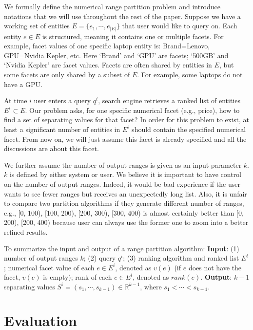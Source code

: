 We formally define the numerical range partition problem and introduce notations that we will use throughout the rest of the paper. Suppose we have a working set of entities $E=\{e_1, \cdots, e_{|E|}\}$ that user would like to query on. Each entity $e\in E$ is structured, meaning it contains one or multiple facets. For example, facet values of one specific laptop entity is: Brand=Lenovo, GPU=Nvidia Kepler, etc. Here `Brand' and `GPU' are facets; `500GB' and `Nvidia Kepler' are facet values. Facets are often shared by entities in $E$, but some facets are only shared by a subset of $E$. For example, some laptops do not have a GPU. 


At time $i$ user enters a query $q^i$, search engine retrieves a ranked list of entities $E^i\subset E$. Our problem asks, for one specific numerical facet (e.g., price), how to find a set of separating values for that facet? In order for this problem to exist, at least a significant number of entities in $E^i$ should contain the specified numerical facet. From now on, we will just assume this facet is already specified and all the discussions are about this facet. 

We further assume the number of output ranges is given as an input parameter $k$. $k$ is defined by either system or user. We believe it is important to have control on the number of output ranges. Indeed, it would be bad experience if the user wants to see fewer ranges but receives an unexpectedly long list. Also, it is unfair to compare two partition algorithms if they generate different number of ranges, e.g., [0, 100), [100, 200), [200, 300), [300, 400) is almost certainly better than [0, 200), [200, 400) because user can always use the former one to zoom into a better refined results. 

To summarize the input and output of a range partition algorithm: \textbf{Input}: (1) number of output ranges $k$; (2) query $q^i$; (3) ranking algorithm and ranked list $E^i$; numerical facet value of each $e\in E^i$, denoted as $v(e)$ (if $e$ does not have the facet, $v(e)$ is empty); rank of each $e\in E^i$, denoted as $rank(e)$. \textbf{Output}: $k-1$ separating values $S^i = (s_1, \cdots, s_{k-1})\in \mathbb{R}^{k-1}$, where $s_1 < \cdots < s_{k-1}$.

\section{Evaluation}
\label{ch2:eval}


